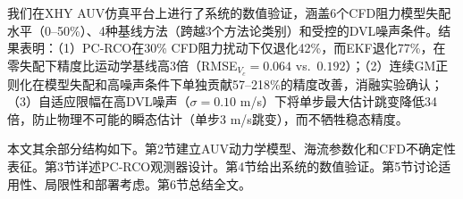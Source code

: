 我们在XHY AUV仿真平台上进行了系统的数值验证，涵盖6个CFD阻力模型失配水平（0--50\%）、4种基线方法（跨越3个方法论类别）和受控的DVL噪声条件。结果表明：（1）PC-RCO在30\% CFD阻力扰动下仅退化42\%，而EKF\cite{long2021trajectory}退化77\%，在零失配下精度比运动学基线高3倍（RMSE$_{V_c}=0.064$ vs.\ $0.192$）；（2）连续GM正则化在模型失配和高噪声条件下单独贡献57--218\%的精度改善，消融实验确认；（3）自适应限幅在高DVL噪声（$\sigma=0.10$ m/s）下将单步最大估计跳变降低34倍，防止物理不可能的瞬态估计（单步3 m/s跳变），而不牺牲稳态精度。

本文其余部分结构如下。第2节建立AUV动力学模型、海流参数化和CFD不确定性表征。第3节详述PC-RCO观测器设计。第4节给出系统的数值验证。第5节讨论适用性、局限性和部署考虑。第6节总结全文。
